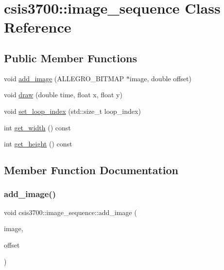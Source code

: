 \hypertarget{classcsis3700_1_1image__sequence}{}\section{csis3700\+:\+:image\+\_\+sequence Class Reference}
\label{classcsis3700_1_1image__sequence}
\subsection*{Public Member Functions}
\begin{DoxyCompactItemize}
\item 
void \hyperlink{classcsis3700_1_1image__sequence_aa8c137829b803075fccc0d2549b0df95}{add\+\_\+image} (A\+L\+L\+E\+G\+R\+O\+\_\+\+B\+I\+T\+M\+AP $\ast$image, double offset)
\item 
void \hyperlink{classcsis3700_1_1image__sequence_a4a7dadd01b965db2052439584171f7a6}{draw} (double time, float x, float y)
\item 
void \hyperlink{classcsis3700_1_1image__sequence_aa1a83d01babd833a16ac89759a4e0a57}{set\+\_\+loop\+\_\+index} (std\+::size\+\_\+t loop\+\_\+index)
\item 
int \hyperlink{classcsis3700_1_1image__sequence_ad57c13fa3887f421b1b691c442d3e902}{get\+\_\+width} () const
\item 
int \hyperlink{classcsis3700_1_1image__sequence_a278c951b17b59580c872600e91c9a265}{get\+\_\+height} () const
\end{DoxyCompactItemize}


\subsection{Member Function Documentation}
\mbox{\label{classcsis3700_1_1image__sequence_aa8c137829b803075fccc0d2549b0df95}} 
\subsubsection{\texorpdfstring{add\+\_\+image()}{add\_image()}}
{\footnotesize\ttfamily void csis3700\+::image\+\_\+sequence\+::add\+\_\+image (\begin{DoxyParamCaption}\item[{A\+L\+L\+E\+G\+R\+O\+\_\+\+B\+I\+T\+M\+AP $\ast$}]{image,  }\item[{double}]{offset }\end{DoxyParamCaption})}


